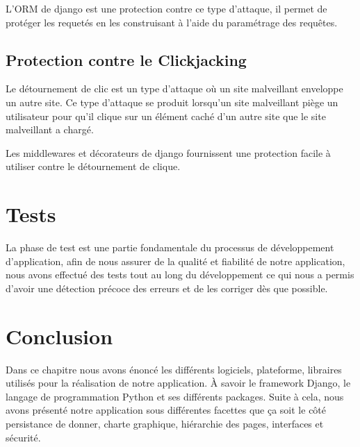         L’ORM de django est une protection contre ce type d’attaque, il permet de protéger les requetés en les construisant à l'aide du paramétrage des requêtes.

    \subsection{Protection contre le Clickjacking}
        Le détournement de clic est un type d'attaque où un site malveillant enveloppe un autre site. Ce type d’attaque se produit lorsqu’un site malveillant piège un utilisateur pour qu’il clique sur un élément caché d’un autre site que le site malveillant a chargé. 
        
        Les middlewares et décorateurs de django fournissent une protection facile à utiliser contre le détournement de clique.
        
\section{Tests}
    La phase de test est une partie fondamentale du processus de développement d’application, afin de nous assurer de la qualité et fiabilité de notre application, nous avons effectué des tests tout au long du développement ce qui nous a permis d’avoir une détection précoce des erreurs et de les corriger dès que possible.
    
\section{Conclusion}
    Dans ce chapitre nous avons énoncé les différents logiciels, plateforme, libraires utilisés pour la réalisation de notre application. À savoir le framework Django, le langage de programmation Python et ses différents packages. Suite à cela, nous avons présenté notre application sous différentes facettes que ça soit le côté persistance de donner, charte graphique, hiérarchie des pages, interfaces et sécurité.      

